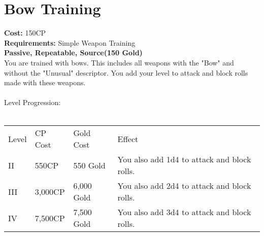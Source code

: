 \section{Bow Training}\label{perk:bowTraining}
\textbf{Cost:} 150CP\\
\textbf{Requirements:} Simple Weapon Training\\
\textbf{Passive, Repeatable, Source(150 Gold)}\\
You are trained with bows.
This includes all weapons with the "Bow" and without the "Unusual" descriptor.
You add your level to attack and block rolls made with these weapons.\\
\\
Level Progression:\\
\\
\begin{tabular}{l | l | l | l}
	Level & CP Cost & Gold Cost & Effect\\
	II & 550CP & 550 Gold & You also add 1d4 to attack and block rolls.\\
	III & 3,000CP & 6,000 Gold & You also add 2d4 to attack and block rolls.\\
	IV & 7,500CP & 7,500 Gold & You also add 3d4 to attack and block rolls.\\
\end{tabular}